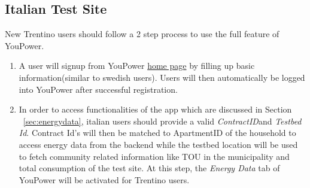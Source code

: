 \subsection{Italian Test Site}
New Trentino users should follow a 2 step process to use the full feature of YouPower.\\
\begin{enumerate}
\item A user will signup from YouPower \href{https://app.civisproject.eu/frontend.html#/welcome/}{home page} by filling up basic information(similar to swedish users). 
Users will then automatically be logged into YouPower after successful registration.
\item In order to access functionalities of the app which are discussed in Section  ~\ref{sec:energydata}, italian users should provide a valid \emph{ContractID}and \emph{Testbed Id}. Contract Id's will then be matched to ApartmentID of the household to access energy data from the backend while the testbed location will be used to fetch community related information like TOU in the municipality and  total consumption of the test site. At this step, the \emph{Energy Data} tab of YouPower will be activated for Trentino users.
\end{enumerate}
